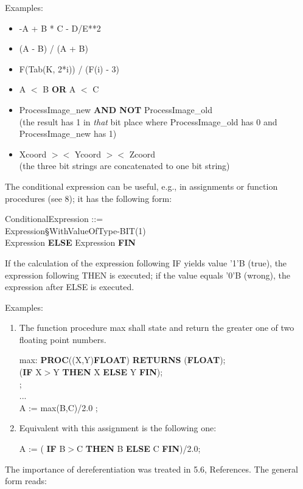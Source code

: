 Examples:

\begin{itemize}
\item -A + B * C - D/E**2
\item (A - B) / (A + B)
\item F(Tab(K, 2*i)) / (F(i) - 3)
\item A $<$ B {\bf OR} A $<$ C
\item ProcessImage\_new {\bf AND NOT} ProcessImage\_old\\
      (the result has 1 in {\it that} bit place where ProcessImage\_old
      has 0 and ProcessImage\_new has 1)
\item Xcoord $><$ Ycoord $><$ Zcoord\\
      (the three bit strings are concatenated to one bit string)
\end{itemize}

The conditional expression can be useful, e.g., in assignments or
function procedures (see 8); it has the following form:

ConditionalExpression ::=\\
 Expression\S WithValueOfType-BIT(1)\\
\x {} Expression {\bf ELSE} Expression {\bf FIN}

If the calculation of the expression following IF yields value '1'B
(true), the expression following THEN is executed; if the value equals '0'B (wrong), the expression after ELSE
is executed.

Examples:

\begin{enumerate}
\item The function procedure max shall state and return the greater one
      of two floating point numbers.

      max: {\bf PROC}((X,Y){\bf FLOAT}) {\bf RETURNS} ({\bf FLOAT});\\
      ({\bf IF} X$>$Y {\bf THEN} X {\bf ELSE} Y {\bf FIN});\\
      ;\\
      ... \\
      A := max(B,C)/2.0 ;

\item Equivalent with this assignment is the following one:

      A := ( {\bf IF} B$>$C {\bf THEN} B {\bf ELSE} C {\bf FIN})/2.0;
\end{enumerate}

The importance of dereferentiation was treated in 5.6, References. The
general form reads:

